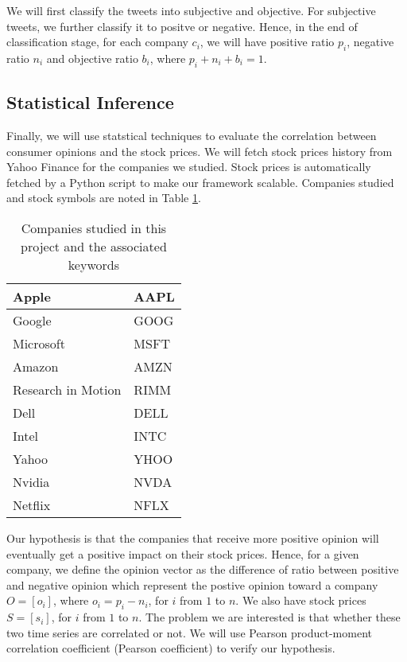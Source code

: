 \documentclass[12pt]{article}
\begin{document}
We will first classify the tweets into subjective and objective. For subjective tweets, we further classify it to positve or negative. Hence, in the end of classification stage, for each company $c_i$, we will have positive ratio $p_i$, negative ratio $n_i$ and objective ratio $b_i$, where $p_i + n_i + b_i = 1$.

\subsection{Statistical Inference}\label{statistical-inference}
Finally, we will use statstical techniques to evaluate the correlation between consumer opinions and the stock prices. We will fetch stock prices history from Yahoo Finance for the companies we studied. Stock prices is automatically fetched by a Python script to make our framework scalable. Companies studied and stock symbols are noted in Table \ref{companies-symbols}.

\begin{table}
\begin{center}
    \begin{tabular}{ | l || l | }
        \hline
        Apple &  AAPL \\ \hline
        Google & GOOG \\ \hline
        Microsoft & MSFT \\ \hline
        Amazon & AMZN \\ \hline
        Research in Motion & RIMM \\ \hline
        Dell & DELL \\ \hline
        Intel & INTC \\ \hline
        Yahoo & YHOO \\ \hline
        Nvidia & NVDA \\ \hline
        Netflix & NFLX \\
        \hline
    \end{tabular}
\caption{Companies studied in this project and the associated keywords}
\label{companies-symbols}
\end{center}
\end{table}

Our hypothesis is that the companies that receive more positive opinion will eventually get a positive impact on their stock prices. Hence, for a given company, we define the opinion vector as the difference of ratio between positive and negative opinion which represent the postive opinion toward a company $O = [o_i]$, where $o_i = p_i - n_i$, for $i$ from $1$ to $n$. We also have stock prices $S = [s_i]$, for $i$ from $1$ to $n$. The problem we are interested is that whether these two time series are correlated or not. We will use Pearson product-moment correlation coefficient (Pearson coefficient) to verify our hypothesis.
\end{document}

